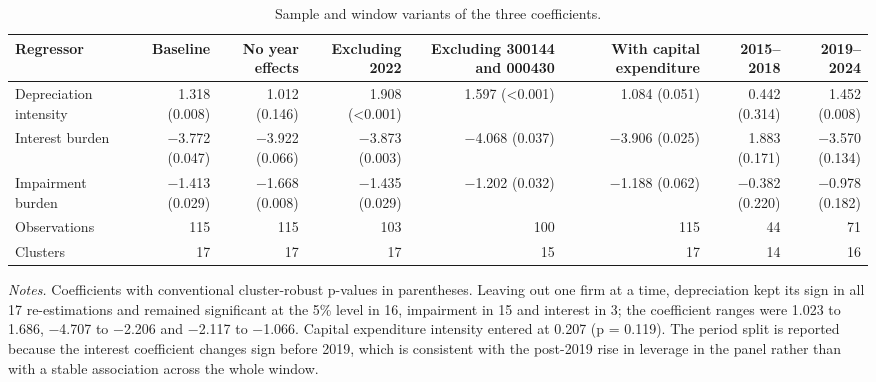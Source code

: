 \documentclass[review,3p,times]{elsarticle}
\begin{document}
\begin{table}[!htbp]
\centering
\renewcommand{\thetable}{A8}
\caption{Sample and window variants of the three coefficients.}\label{tab:A8}
\begin{minipage}{\textwidth}
\centering
\footnotesize
\begin{adjustbox}{max width=\textwidth}
\begin{tabular}{@{}lrrrrrrr@{}}
\toprule
Regressor & Baseline & No year effects & Excluding 2022 & Excluding 300144 and 000430 & With capital expenditure & 2015--2018 & 2019--2024 \\
\midrule
Depreciation intensity & 1.318 (0.008) & 1.012 (0.146) & 1.908 (<0.001) & 1.597 (<0.001) & 1.084 (0.051) & 0.442 (0.314) & 1.452 (0.008) \\
Interest burden & \ensuremath{-}3.772 (0.047) & \ensuremath{-}3.922 (0.066) & \ensuremath{-}3.873 (0.003) & \ensuremath{-}4.068 (0.037) & \ensuremath{-}3.906 (0.025) & 1.883 (0.171) & \ensuremath{-}3.570 (0.134) \\
Impairment burden & \ensuremath{-}1.413 (0.029) & \ensuremath{-}1.668 (0.008) & \ensuremath{-}1.435 (0.029) & \ensuremath{-}1.202 (0.032) & \ensuremath{-}1.188 (0.062) & \ensuremath{-}0.382 (0.220) & \ensuremath{-}0.978 (0.182) \\
Observations & 115 & 115 & 103 & 100 & 115 & 44 & 71 \\
Clusters & 17 & 17 & 17 & 15 & 17 & 14 & 16 \\
\bottomrule
\end{tabular}
\end{adjustbox}
\par\medskip
\raggedright
\noindent\textit{Notes.} Coefficients with conventional cluster-robust p-values in parentheses. Leaving out one firm at a time, depreciation kept its sign in all 17 re-estimations and remained significant at the 5\% level in 16, impairment in 15 and interest in 3; the coefficient ranges were 1.023 to 1.686, \ensuremath{-}4.707 to \ensuremath{-}2.206 and \ensuremath{-}2.117 to \ensuremath{-}1.066. Capital expenditure intensity entered at 0.207 (p = 0.119). The period split is reported because the interest coefficient changes sign before 2019, which is consistent with the post-2019 rise in leverage in the panel rather than with a stable association across the whole window.
\end{minipage}
\end{table}
\end{document}
